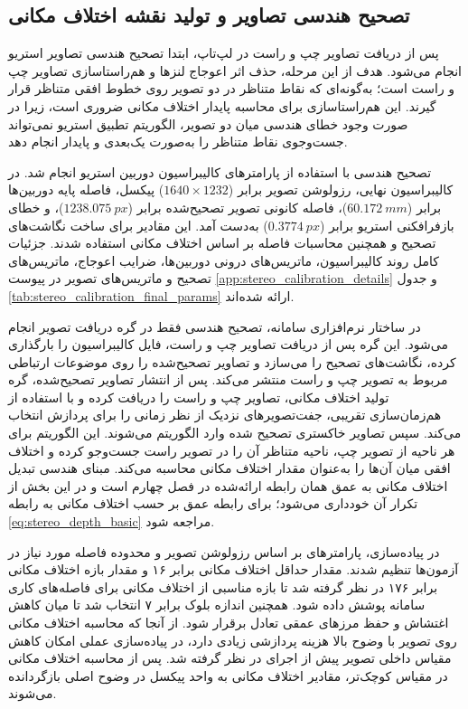 \subsection{تصحیح هندسی تصاویر و تولید نقشه اختلاف مکانی}
\label{subsec:real_depth_map_generation}

پس از دریافت تصاویر چپ و راست در لپ‌تاپ، ابتدا تصحیح هندسی تصاویر استریو انجام می‌شود. هدف از این مرحله، حذف اثر اعوجاج لنزها و هم‌راستاسازی تصاویر چپ و راست است؛ به‌گونه‌ای که نقاط متناظر در دو تصویر روی خطوط افقی متناظر قرار گیرند. این هم‌راستاسازی برای محاسبه پایدار اختلاف مکانی ضروری است، زیرا در صورت وجود خطای هندسی میان دو تصویر، الگوریتم تطبیق استریو نمی‌تواند جست‌وجوی نقاط متناظر را به‌صورت یک‌بعدی و پایدار انجام دهد.

تصحیح هندسی با استفاده از پارامترهای کالیبراسیون دوربین استریو انجام شد. در کالیبراسیون نهایی، رزولوشن تصویر برابر ($1640 \times 1232$) پیکسل، فاصله پایه دوربین‌ها برابر ($60.172~mm$)، فاصله کانونی تصویر تصحیح‌شده برابر ($1238.075~px$)، و خطای بازفرافکنی استریو برابر ($0.3774~px$) به‌دست آمد. این مقادیر برای ساخت نگاشت‌های تصحیح و همچنین محاسبات فاصله بر اساس اختلاف مکانی استفاده شدند. جزئیات کامل روند کالیبراسیون، ماتریس‌های درونی دوربین‌ها، ضرایب اعوجاج، ماتریس‌های تصحیح و ماتریس‌های تصویر در پیوست \ref{app:stereo_calibration_details} و جدول \ref{tab:stereo_calibration_final_params} ارائه شده‌اند.

در ساختار نرم‌افزاری سامانه، تصحیح هندسی فقط در گره دریافت تصویر انجام می‌شود. این گره پس از دریافت تصاویر چپ و راست، فایل کالیبراسیون را بارگذاری کرده، نگاشت‌های تصحیح را می‌سازد و تصاویر تصحیح‌شده را روی موضوعات ارتباطی مربوط به تصویر چپ و راست منتشر می‌کند. پس از انتشار تصاویر تصحیح‌شده، گره تولید اختلاف مکانی، تصاویر چپ و راست را دریافت کرده و با استفاده از هم‌زمان‌سازی تقریبی، جفت‌تصویرهای نزدیک از نظر زمانی را برای پردازش انتخاب می‌کند. سپس تصاویر خاکستری تصحیح‌ شده وارد الگوریتم  می‌شوند. این الگوریتم برای هر ناحیه از تصویر چپ، ناحیه متناظر آن را در تصویر راست جست‌وجو کرده و اختلاف افقی میان آن‌ها را به‌عنوان مقدار اختلاف مکانی محاسبه می‌کند. مبنای هندسی تبدیل اختلاف مکانی به عمق همان رابطه ارائه‌شده در فصل چهارم است و در این بخش از تکرار آن خودداری می‌شود؛ برای رابطه عمق بر حسب اختلاف مکانی به رابطه \ref{eq:stereo_depth_basic} مراجعه شود.

در پیاده‌سازی، پارامترهای  بر اساس رزولوشن تصویر و محدوده فاصله مورد نیاز در آزمون‌ها تنظیم شدند. مقدار حداقل اختلاف مکانی برابر ۱۶ و مقدار بازه اختلاف مکانی برابر ۱۷۶ در نظر گرفته شد تا بازه مناسبی از اختلاف مکانی برای فاصله‌های کاری سامانه پوشش داده شود. همچنین اندازه بلوک برابر ۷ انتخاب شد تا میان کاهش اغتشاش و حفظ مرزهای عمقی تعادل برقرار شود. از آنجا که محاسبه اختلاف مکانی روی تصویر با وضوح بالا هزینه پردازشی زیادی دارد، در پیاده‌سازی عملی امکان کاهش مقیاس داخلی تصویر پیش از اجرای  در نظر گرفته شد. پس از محاسبه اختلاف مکانی در مقیاس کوچک‌تر، مقادیر اختلاف مکانی به واحد پیکسل در وضوح اصلی بازگردانده می‌شوند.

